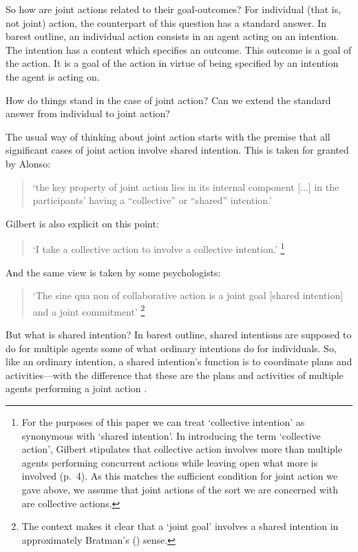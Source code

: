 \documentclass[12pt,a4paper]{extarticle}
\begin{document}
So how are joint actions related to their goal-outcomes?  For individual (that is, not joint) action, the counterpart of this question has a standard answer.  In barest outline, an individual action consists in an agent acting on an intention.  The intention has a content which specifies an outcome.
This outcome is a goal of the action.
It is a goal of the action in virtue of being specified by an intention the agent is acting on. 


How do things stand in the case of joint action?  Can we extend the standard answer from individual to joint action?  

The usual way of thinking about joint action starts with the premise that all significant cases of joint action involve shared intention.  This is taken for granted by Alonso:
%
\begin{quote}
`the key property of joint action lies in its internal component [...] in the participants’ having a “collective” or “shared” intention.' \citep[pp. 444-5]{alonso_shared_2009}
\end{quote}
%
Gilbert is also explicit on this point:  
%
\begin{quote} 
`I take a collective action to involve a collective intention.'  \citep[p.\ 5]{Gilbert:2006wr}\footnote{
For the purposes of this paper we can treat `collective intention' as synonymous with `shared intention'.  
In introducing the term `collective action', Gilbert stipulates that collective action involves more than multiple agents performing concurrent actions while leaving open what more is involved (p.\ 4).   
As this matches the sufficient condition for joint action we gave above, we assume that joint actions of the sort we are concerned with are collective actions.
}
\end{quote}
%
And the same view is taken by some psychologists:
%
\begin{quote}
`The sine qua non of collaborative action is a joint goal [shared intention] and a joint commitment’ 
\citep[p.\ 181]{tomasello:2008origins}\footnote{
The context makes it clear that a `joint goal' involves a shared intention in approximately Bratman's (\citeyear{Bratman:1993je}) sense.
}
\end{quote}
%
But what is shared intention?  
In barest outline, shared intentions are supposed to do for multiple agents some of what ordinary intentions do for individuals.  So, like an ordinary intention, a shared intention's function is to coordinate plans and activities---with the difference that these are the plans and activities of multiple agents performing a joint action \citep{Bratman:1993je}.
\end{document}
